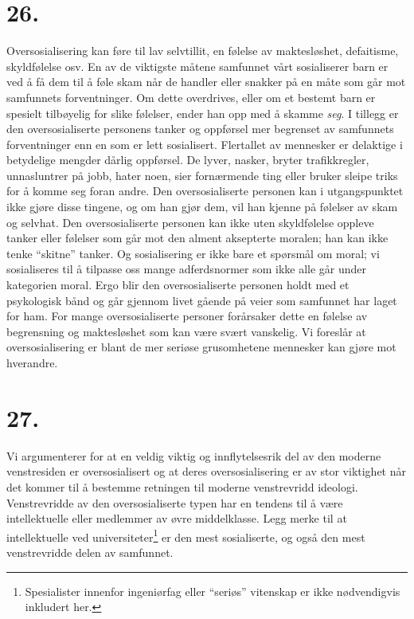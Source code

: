 \documentclass[oneside]{book}
\begin{document}
\section*{26.}
Oversosialisering kan føre til lav selvtillit, en følelse av maktesløshet,
defaitisme, skyldfølelse osv. En av de viktigste måtene samfunnet vårt
sosialiserer barn er ved å få dem til å føle skam når de handler eller snakker
på en måte som går mot samfunnets forventninger. Om dette overdrives, eller om
et bestemt barn er spesielt tilbøyelig for slike følelser, ender han opp med å
skamme {\em seg}. I tillegg er den oversosialiserte personens tanker og
oppførsel mer begrenset av samfunnets forventninger enn en som er lett
sosialisert. Flertallet av mennesker er delaktige i betydelige mengder dårlig
oppførsel. De lyver, nasker, bryter trafikkregler, unnasluntrer på jobb, hater
noen, sier fornærmende ting eller bruker sleipe triks for å komme seg foran
andre. Den oversosialiserte personen kan i utgangspunktet ikke gjøre disse
tingene, og om han gjør dem, vil han kjenne på følelser av skam og selvhat. Den
oversosialiserte personen kan ikke uten skyldfølelse oppleve tanker eller
følelser som går mot den alment aksepterte moralen; han kan ikke tenke
``skitne'' tanker. Og sosialisering er ikke bare et spørsmål om moral; vi
sosialiseres til å tilpasse oss mange adferdsnormer som ikke alle går under
kategorien moral. Ergo blir den oversosialiserte personen holdt med et
psykologisk bånd og går gjennom livet gående på veier som samfunnet har laget
for ham. For mange oversosialiserte personer forårsaker dette en følelse av
begrensning og maktesløshet som kan være svært vanskelig. Vi foreslår at
oversosialisering er blant de mer seriøse grusomhetene mennesker kan gjøre mot
hverandre.

\section*{27.}
Vi argumenterer for at en veldig viktig og innflytelsesrik del av den moderne
venstresiden er oversosialisert og at deres oversosialisering er av stor
viktighet når det kommer til å bestemme retningen til moderne venstrevridd
ideologi. Venstrevridde av den oversosialiserte typen har en tendens til å være
intellektuelle eller medlemmer av øvre middelklasse. Legg merke til at
intellektuelle ved universiteter\footnote{Spesialister innenfor ingeniørfag
eller ``seriøs'' vitenskap er ikke nødvendigvis inkludert her.} er den mest
sosialiserte, og også den mest venstrevridde delen av samfunnet.
\end{document}
